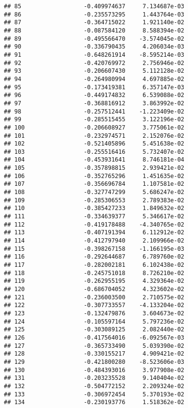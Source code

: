 \documentclass[
]{article}
\begin{document}
\begin{verbatim}
## 85                  -0.409974637     7.134687e-03
## 86                  -0.235573295     1.443764e-03
## 87                  -0.364715022     1.921140e-02
## 88                  -0.087584120     8.588394e-02
## 89                  -0.495566470    -3.574045e-02
## 90                  -0.336790435     4.206034e-03
## 91                  -0.648261914    -8.595214e-03
## 92                  -0.420769972     2.756946e-02
## 93                  -0.206607430     5.112128e-02
## 94                  -0.264980994     4.697885e-02
## 95                  -0.173419381     6.357147e-03
## 96                  -0.449174832     6.539088e-02
## 97                  -0.368816912     3.863992e-02
## 98                  -0.257512441    -1.223409e-02
## 99                  -0.285515455     3.122196e-02
## 100                 -0.206608927     3.775061e-02
## 101                 -0.232974571     2.152076e-02
## 102                 -0.521405896     5.451638e-02
## 103                 -0.255516416     5.732407e-02
## 104                 -0.453931641     8.746181e-04
## 105                 -0.357898815     2.939421e-02
## 106                 -0.352765296     1.451635e-02
## 107                 -0.356696784     1.107581e-02
## 108                 -0.327747299     5.686247e-02
## 109                 -0.285306553     2.789383e-02
## 110                 -0.385427233     1.849632e-02
## 111                 -0.334639377     5.346617e-02
## 112                 -0.419178488    -4.340765e-02
## 113                 -0.407191394     6.112912e-02
## 114                 -0.412797940     2.109966e-02
## 115                 -0.398267158    -1.166195e-03
## 116                 -0.292644687     6.789760e-02
## 117                 -0.282002181     6.102438e-02
## 118                 -0.245751018     8.726210e-02
## 119                 -0.262955195     4.329364e-02
## 120                 -0.686704052     4.323602e-02
## 121                 -0.236003500     2.710575e-02
## 122                 -0.307733557    -4.133204e-02
## 123                 -0.132479876     3.604673e-02
## 124                 -0.105597164     5.797236e-02
## 125                 -0.303089125     2.082440e-02
## 126                 -0.417564016    -6.092567e-03
## 127                 -0.365733490     5.039390e-02
## 128                 -0.330155217     4.909421e-02
## 129                 -0.421800280    -8.523606e-03
## 130                 -0.484393016     3.977908e-02
## 131                 -0.203235528     9.140404e-02
## 132                 -0.504772152     2.209324e-02
## 133                 -0.306972454     5.370193e-02
## 134                 -0.230193776     1.518362e-02

\end{verbatim}
\end{document}
